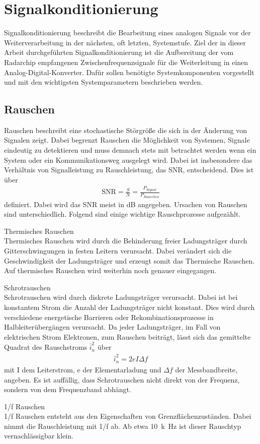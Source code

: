 \chapter{Signalkonditionierung}
Signalkonditionierung beschreibt die Bearbeitung eines analogen Signals vor der Weiterverarbeitung in der nächsten, oft letzten, Systemstufe. Ziel der in dieser Arbeit durchgeführten Signalkonditionierung ist die Aufbereitung der vom Radarchip empfangenen Zwischenfrequenzsignale für die Weiterleitung in einen Analog-Digital-Konverter. Dafür sollen benötigte Systemkomponenten vorgestellt und mit den wichtigsten Systemparametern beschrieben werden. 
\section{Rauschen}
Rauschen beschreibt eine stochastische Störgröße die sich in der Änderung von Signalen zeigt. Dabei begrenzt Rauschen die Möglichkeit von Systemen, Signale eindeutig zu detektieren und muss demnach stets mit betrachtet werden wenn ein System oder ein Kommunikationsweg ausgelegt wird. Dabei ist insbesondere das Verhältnis von Signalleistung zu Rauschleistung, das SNR, entscheidend. Dies ist über
\begin{align}
\text{SNR} = \frac{S}{N} = \frac{P_{Signal}}{P_{Rauschen}}
\end{align}
definiert. Dabei wird das SNR meist in dB angegeben. Ursachen von Rauschen sind unterschiedlich. Folgend sind einige wichtige Rauschprozesse aufgezählt.
\begin{description}
\item Thermisches Rauschen\\
Thermisches Rauschen wird durch die Behinderung freier Ladungsträger durch Gitterschwingungen in festen Leitern verursacht. Dabei verändert sich die Geschwindigkeit der Ladungsträger und erzeugt somit das Thermische Rauschen. Auf thermisches Rauschen wird weiterhin noch genauer eingegangen.
\item Schrotrauschen \\
Schrotrauschen wird durch diskrete Ladungsträger verursacht. Dabei ist bei konstantem Strom die Anzahl der Ladungsträger nicht konstant. Dies wird durch verschiedene energetische Barrieren oder Rekombinationsprozesse in Halbleiterübergängen verursacht. Da jeder Ladungsträger, im Fall von elektrischen Strom Elektronen, zum Rauschen beiträgt, lässt sich das gemittelte Quadrat des Rauschstroms $\bar{i}_{n}^2$ über
\begin{align}
\bar{i}_{n}^2 = 2eI\Delta f
\end{align}
mit I dem Leiterstrom, e der Elementarladung und $\Delta f $ der Messbandbreite, angeben\cite{Rauscherino}. Es ist auffällig, dass Schrotrauschen nicht direkt von der Frequenz, sondern von dem Frequenzband abhängt.
\item 1/f Rauschen \\
1/f Rauschen entsteht aus den Eigenschaften von Grenzflächenzuständen\cite{HFKompo}.  Dabei nimmt die Rauschleistung mit 1/f ab. Ab etwa \SI{10}{k\hertz} ist dieser Rauschtyp vernachlässigbar klein.
\end{description}

